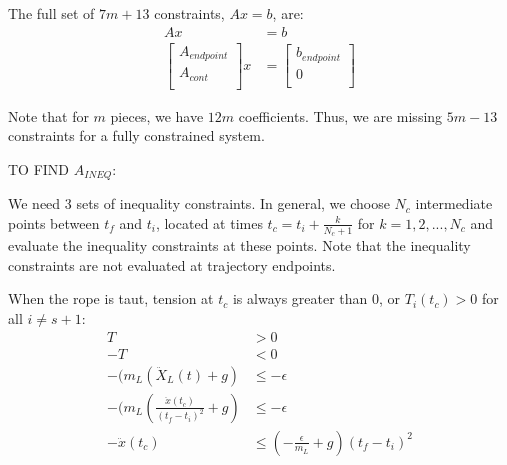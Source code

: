 \documentclass[11pt]{article}
\begin{document}
 
 
 
The full set of $7m+13$ constraints, $Ax = b$, are:
\begin{align}
\nonumber Ax &= b \\
\label{eqn: Akeyframes} 
\begin{bmatrix}
A_{endpoint} \\
A_{cont} \\
 \end{bmatrix}
 x 
& = 
 \begin{bmatrix}
b_{endpoint} \\
0 \\
 \end{bmatrix} 
\end{align}

Note that for $m$ pieces, we have $12m$ coefficients. Thus, we are missing $5m-13$ constraints for a fully constrained system.




\mbox{} \newline
\mbox{} \newline
TO FIND $A_{INEQ}$:
 
We need 3 sets of inequality constraints. In general, we choose $N_c$ intermediate points between $t_f$ and $t_i$, located at times $t_c = t_i+\frac{k}{N_c+1}$ for $k = 1, 2, ..., N_c$ and evaluate the inequality constraints at these points. Note that the inequality constraints are not evaluated at trajectory endpoints. 

\mbox{} \newline
When the rope is taut, tension at $t_c$ is always greater than 0, or $T_i(t_c) > 0$ for all $i \ne s+1$:
\begin{align*}
T &> 0 \\
-T &< 0 \\
-(m_L (\ddot{X}_L(t)+g) &\le -\epsilon \\
-(m_L (\frac{ \ddot{x}(t_c) }{(t_f - t_i)^2}+g) &\le -\epsilon \\
-\ddot{x}(t_c) &\le  (-\frac{ \epsilon }{m_L} + g ) (t_f-t_i)^2 \\
\end{align*}
 
\end{document}
